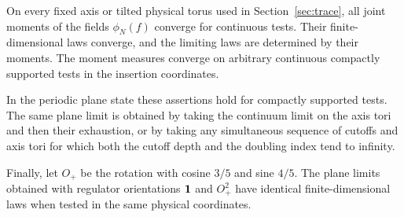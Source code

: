 \begin{proposition}
\label{prop:continuum-limit}
On every fixed axis or tilted physical torus used in
Section~\ref{sec:trace}, all joint moments of the fields
$\phi_N(f)$ converge for continuous tests.  Their finite-dimensional
laws converge, and the limiting laws are determined by their moments.
The moment measures converge on arbitrary continuous compactly
supported tests in the insertion coordinates.

In the periodic plane state these assertions hold for compactly
supported tests.  The same plane limit is obtained by taking the
continuum limit on the axis tori and then their exhaustion, or by taking
any simultaneous sequence of cutoffs and axis tori for which both the
cutoff depth and the doubling index tend to infinity.

Finally, let $O_+$ be the rotation with cosine $3/5$ and sine $4/5$.
The plane limits obtained with regulator orientations $\mathbf 1$ and
$O_+^2$ have identical finite-dimensional laws when tested in the same
physical coordinates.
\end{proposition}

